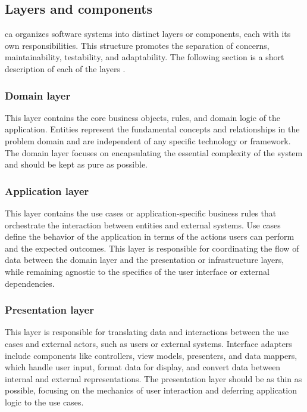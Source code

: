 \subsection{Layers and components} \label{subsec_layers}

\gls{ca} organizes software systems into distinct layers or components, each
with its own responsibilities. This structure promotes the separation of concerns,
maintainability, testability, and adaptability. The following section is a short
description of each of the layers \parencite{robert_c_martin_clean_2018}.

\subsubsection{Domain layer}
This layer contains the core business objects, rules, and domain logic of the application.
Entities represent the fundamental concepts and relationships in the problem domain and
are independent of any specific technology or framework. The domain layer focuses on
encapsulating the essential complexity of the system and should be kept as pure as
possible.

\subsubsection{Application layer}
This layer contains the use cases or application-specific
business rules that orchestrate the interaction between entities and external systems. Use
cases define the behavior of the application in terms of the actions users can perform and
the expected outcomes. This layer is responsible for coordinating the flow of data between
the domain layer and the presentation or infrastructure layers, while remaining agnostic
to the specifics of the user interface or external dependencies.

\subsubsection{Presentation layer}
This layer is responsible for translating data and interactions between the use cases and
external actors, such as users or external systems. Interface adapters include components
like controllers, view models, presenters, and data mappers, which handle user input,
format data for display, and convert data between internal and external representations.
The presentation layer should be as thin as possible, focusing on the mechanics of user
interaction and deferring application logic to the use cases.

